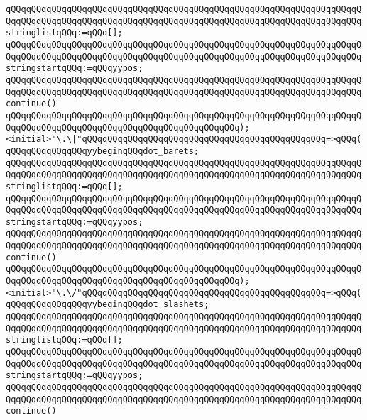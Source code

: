 \verb|qQQqqQQqqQQqqQQqqQQqqQQqqQQqqQQqqQQqqQQqqQQqqQQqqQQqqQQqqQQqqQQqqQQqqQQqqQQqqQQqqQQqqQQqqQQqqQQqqQQqqQQqqQQqqQQqqQQqqQQqqQQqqQQqqQQqqQQqqQQqstringlistqQQq:=qQQq[];|\newline
\verb|qQQqqQQqqQQqqQQqqQQqqQQqqQQqqQQqqQQqqQQqqQQqqQQqqQQqqQQqqQQqqQQqqQQqqQQqqQQqqQQqqQQqqQQqqQQqqQQqqQQqqQQqqQQqqQQqqQQqqQQqqQQqqQQqqQQqqQQqqQQqstringstartqQQq:=qQQqyypos;|\newline
\verb|qQQqqQQqqQQqqQQqqQQqqQQqqQQqqQQqqQQqqQQqqQQqqQQqqQQqqQQqqQQqqQQqqQQqqQQqqQQqqQQqqQQqqQQqqQQqqQQqqQQqqQQqqQQqqQQqqQQqqQQqqQQqqQQqqQQqqQQqqQQqcontinue()|\newline
\verb|qQQqqQQqqQQqqQQqqQQqqQQqqQQqqQQqqQQqqQQqqQQqqQQqqQQqqQQqqQQqqQQqqQQqqQQqqQQqqQQqqQQqqQQqqQQqqQQqqQQqqQQqqQQqqQQqqQQq);|\newline
\newline
\verb|<initial>"\.\|\verb#|"qQQqqQQqqQQqqQQqqQQqqQQqqQQqqQQqqQQqqQQqqQQqqQQq=>qQQq(qQQqqQQqqQQqqQQqyybeginqQQqdot_barets;#\newline
\verb|qQQqqQQqqQQqqQQqqQQqqQQqqQQqqQQqqQQqqQQqqQQqqQQqqQQqqQQqqQQqqQQqqQQqqQQqqQQqqQQqqQQqqQQqqQQqqQQqqQQqqQQqqQQqqQQqqQQqqQQqqQQqqQQqqQQqqQQqqQQqstringlistqQQq:=qQQq[];|\newline
\verb|qQQqqQQqqQQqqQQqqQQqqQQqqQQqqQQqqQQqqQQqqQQqqQQqqQQqqQQqqQQqqQQqqQQqqQQqqQQqqQQqqQQqqQQqqQQqqQQqqQQqqQQqqQQqqQQqqQQqqQQqqQQqqQQqqQQqqQQqqQQqstringstartqQQq:=qQQqyypos;|\newline
\verb|qQQqqQQqqQQqqQQqqQQqqQQqqQQqqQQqqQQqqQQqqQQqqQQqqQQqqQQqqQQqqQQqqQQqqQQqqQQqqQQqqQQqqQQqqQQqqQQqqQQqqQQqqQQqqQQqqQQqqQQqqQQqqQQqqQQqqQQqqQQqcontinue()|\newline
\verb|qQQqqQQqqQQqqQQqqQQqqQQqqQQqqQQqqQQqqQQqqQQqqQQqqQQqqQQqqQQqqQQqqQQqqQQqqQQqqQQqqQQqqQQqqQQqqQQqqQQqqQQqqQQqqQQqqQQq);|\newline
\newline
\verb|<initial>"\.\/"qQQqqQQqqQQqqQQqqQQqqQQqqQQqqQQqqQQqqQQqqQQqqQQq=>qQQq(qQQqqQQqqQQqqQQqyybeginqQQqdot_slashets;|\newline
\verb|qQQqqQQqqQQqqQQqqQQqqQQqqQQqqQQqqQQqqQQqqQQqqQQqqQQqqQQqqQQqqQQqqQQqqQQqqQQqqQQqqQQqqQQqqQQqqQQqqQQqqQQqqQQqqQQqqQQqqQQqqQQqqQQqqQQqqQQqqQQqstringlistqQQq:=qQQq[];|\newline
\verb|qQQqqQQqqQQqqQQqqQQqqQQqqQQqqQQqqQQqqQQqqQQqqQQqqQQqqQQqqQQqqQQqqQQqqQQqqQQqqQQqqQQqqQQqqQQqqQQqqQQqqQQqqQQqqQQqqQQqqQQqqQQqqQQqqQQqqQQqqQQqstringstartqQQq:=qQQqyypos;|\newline
\verb|qQQqqQQqqQQqqQQqqQQqqQQqqQQqqQQqqQQqqQQqqQQqqQQqqQQqqQQqqQQqqQQqqQQqqQQqqQQqqQQqqQQqqQQqqQQqqQQqqQQqqQQqqQQqqQQqqQQqqQQqqQQqqQQqqQQqqQQqqQQqcontinue()|\newline
